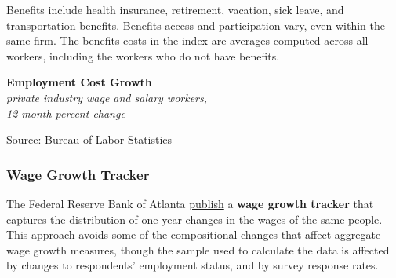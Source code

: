 \documentclass{report}
\makeatletter
\newcommand{\tbllink}[1]{\href{https://raw.githubusercontent.com/bdecon/US-chartbook/master/chartbook/data/#1}{\faTable}}
\newcommand*\short[1]{\expandafter\@gobbletwo\number\numexpr#1\relax}
\newcommand{\absnode}[3]{\node[below right, align=left] at (axis cs: #1,#2) {#3};}
\newcommand{\dateaxisticks}{
		date coordinates in=x, axis line style={draw=none},
		xmax={2023-11-01},
		max space between ticks=40,	    
		xtick={{1990-01-01}, {1992-01-01}, {1994-01-01}, 
			{1996-01-01}, {1998-01-01}, {2000-01-01}, 
			{2002-01-01}, {2004-01-01}, {2006-01-01},
			{2008-01-01}, {2010-01-01}, {2012-01-01}, {2014-01-01},
		    {2016-01-01}, {2018-01-01}, {2020-01-01}, {2022-01-01}, 
		    {2024-01-01}, {2026-01-01}},
		minor xtick={{1989-01-01}, {1991-01-01}, {1993-01-01},
			{1995-01-01}, {1997-01-01}, {1999-01-01}, 
			{2001-01-01}, {2003-01-01}, {2005-01-01}, {2007-01-01},
		    {2009-01-01}, {2011-01-01}, {2013-01-01}, {2015-01-01},
		    {2017-01-01}, {2019-01-01}, {2021-01-01}, {2023-01-01}, 
		    {2025-01-01}, {2027-01-01}},
		enlarge y limits={0.06}, enlarge x limits={0.01},
		}
\newcommand{\bbar}[2]{extra #1 ticks = {{#2}}, extra #1 tick labels = ,
		extra #1 tick style = {grid=major, grid style={thick, black!25}},}
\newcommand{\stdline}[4]{\addplot[very thick, no markers, color=#1] 
		table [x=#2, y=#3, col sep=comma] {#4};	}
\newcommand{\rebars}{
		\fill[color=black!10] (axis cs:{2007-12-01},\pgfkeysvalueof{/pgfplots/ymin}) rectangle 
			(axis cs:{2009-07-01}, \pgfkeysvalueof{/pgfplots/ymax});
		\fill[color=black!10] (axis cs:{2001-03-01},\pgfkeysvalueof{/pgfplots/ymin}) rectangle 
			(axis cs:{2001-11-01}, \pgfkeysvalueof{/pgfplots/ymax});
		\fill[color=black!10] (axis cs:{2020-02-01},\pgfkeysvalueof{/pgfplots/ymin}) rectangle 
			(axis cs:{2020-05-01}, \pgfkeysvalueof{/pgfplots/ymax});}
\makeatother
\begin{document}
{\begin{minipage}{0.76\textwidth}
Benefits include health insurance, retirement, vacation, sick leave, and transportation benefits. Benefits access and participation vary, even within the same firm. The benefits costs in the index are averages \href{https://www.bls.gov/opub/mlr/cwc/benefit-cost-concepts-and-the-limitations-of-ecec-measurement.pdf}{computed} across all workers, including the workers who do not have benefits. 
\end{minipage}

\begin{minipage}{0.41\textwidth}
\normalsize \textbf{Employment Cost Growth}\\
\footnotesize{\textit{private industry wage and salary workers,}}\\
\footnotesize{\textit{12-month percent change}}
\vspace{3.9cm}

\hspace{1mm} 

\footnotesize{Source: Bureau of Labor Statistics} \hfill \tbllink{eci.csv}
\end{minipage} \hspace{6mm} \begin{minipage}{0.3\textwidth}
\small 
\end{minipage}
\newpage
\begin{minipage}{0.76\textwidth}   
\subsubsection*{Wage Growth Tracker}
\small The Federal Reserve Bank of Atlanta \href{https://www.frbatlanta.org/chcs/wage-growth-tracker}{publish} a \textbf{wage growth tracker} that captures the distribution of one-year changes in the wages of the same people. This approach avoids some of the compositional changes that affect aggregate wage growth measures, though the sample used to calculate the data is affected by changes to respondents' employment status, and by survey response rates. 


\end{minipage}}
\end{document}
